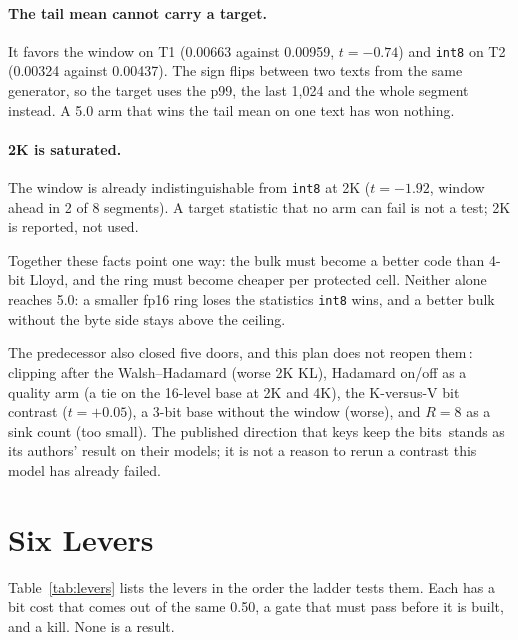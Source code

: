 \documentclass[10pt,twocolumn]{article}
\begin{document}
\paragraph{The tail mean cannot carry a target.} It favors the window on T1 (0.00663 against 0.00959, $t{=}-0.74$) and \texttt{int8} on T2 (0.00324 against 0.00437). The sign flips between two texts from the same generator, so the target uses the p99, the last 1,024 and the whole segment instead. A 5.0 arm that wins the tail mean on one text has won nothing.

\paragraph{2K is saturated.} The window is already indistinguishable from \texttt{int8} at 2K ($t{=}-1.92$, window ahead in 2 of 8 segments). A target statistic that no arm can fail is not a test; 2K is reported, not used.

Together these facts point one way: the bulk must become a better code than 4-bit Lloyd, and the ring must become cheaper per protected cell. Neither alone reaches 5.0: a smaller fp16 ring loses the statistics \texttt{int8} wins, and a better bulk without the byte side stays above the ceiling.

The predecessor also closed five doors, and this plan does not reopen them\,\cite{strata-wp}: clipping after the Walsh--Hadamard (worse 2K KL), Hadamard on/off as a quality arm (a tie on the 16-level base at 2K and 4K), the K-versus-V bit contrast ($t{=}+0.05$), a 3-bit base without the window (worse), and $R{=}8$ as a sink count (too small). The published direction that keys keep the bits\,\cite{spectralkv} stands as its authors' result on their models; it is not a reason to rerun a contrast this model has already failed.

\section{Six Levers}\label{sec:levers}

Table~\ref{tab:levers} lists the levers in the order the ladder tests them. Each has a bit cost that comes out of the same 0.50, a gate that must pass before it is built, and a kill. None is a result.
\end{document}
